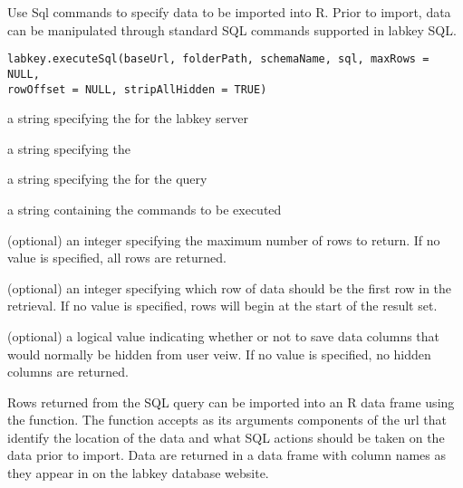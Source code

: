\begin{Description}\relax
Use Sql commands to specify data to be imported into R. Prior to import, data can
be manipulated through standard SQL commands supported in labkey SQL.
\end{Description}
\begin{Usage}
\begin{verbatim}
labkey.executeSql(baseUrl, folderPath, schemaName, sql, maxRows = NULL, 
rowOffset = NULL, stripAllHidden = TRUE)
\end{verbatim}
\end{Usage}
\begin{Arguments}
\begin{ldescription}
\item[\code{baseUrl}] a string specifying the for the labkey server
\item[\code{folderPath}] a string specifying the  
\item[\code{schemaName}] a string specifying the   for the query
\item[\code{sql}] a string containing the  commands to be executed
\item[\code{maxRows}] (optional) an integer specifying the maximum number of rows to return. If no value is specified, all rows are returned.
\item[\code{rowOffset}] (optional) an integer specifying which row of data should be the first row in the retrieval. 
If no value is specified, rows will begin at the start of the result set.
\item[\code{stripAllHidden}] (optional) a logical value indicating whether or not to save data columns that would 
normally be hidden from user veiw. If no value is specified, no hidden columns are returned.
\end{ldescription}
\end{Arguments}
\begin{Details}\relax
Rows returned from the SQL query can be imported into an R data frame using the 
function. The function accepts as its arguments components of the url that identify the location of the
data and what SQL actions should be taken on the data prior to import. Data are returned in a data frame
with column names as they appear in on the labkey database website.
\end{Details}
